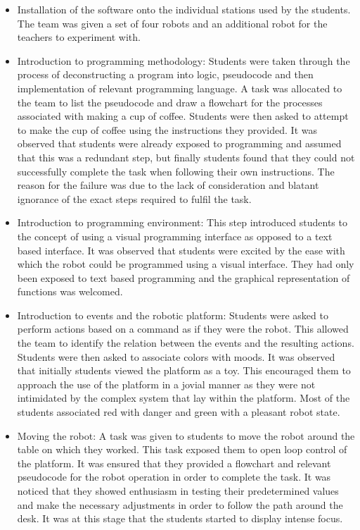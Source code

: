 \documentclass{intech-journal}
\begin{document}
\begin{itemize}
\item Installation of the software onto the individual stations used by the students. The team was given a set of four robots and an additional robot for the teachers to experiment with.
\item Introduction to programming methodology: Students were taken through the process of deconstructing a program into logic, pseudocode and then implementation of relevant programming language. 
A task was allocated to the team to list the pseudocode and draw a flowchart for the processes associated with making a cup of coffee. Students were then asked to attempt to make the cup of coffee using the instructions they provided. 
It was observed that students were already exposed to programming and assumed that this was a redundant step, but finally students found that they could not successfully complete the task when following their own instructions. 
The reason for the failure was due to the lack of consideration and blatant ignorance of the exact steps required to fulfil the task.
\item Introduction to programming environment: This step introduced students to the concept of using a visual programming interface as opposed to a text based interface.  
It was observed  that students were excited by the ease with which the robot could be programmed using a visual interface. 
They had only been exposed to text based programming and the graphical representation of functions was welcomed.
\item Introduction to events and the robotic platform: Students were asked to perform actions based on a command as if they were the robot. 
This allowed the team to identify the relation between the events and the resulting actions. 
Students were then asked to associate colors with moods. 
It was observed that initially students viewed the platform as a toy. 
This encouraged them to approach the use of the platform in a jovial manner as they were not intimidated by the complex system that lay within the platform. 
Most of the students associated red with danger and green with a pleasant robot state.
\item Moving the robot: A task was given to students to move the robot around the table on which they worked. This task exposed them to open loop control of the platform. 
It was ensured that they provided a flowchart and relevant pseudocode for the robot operation in order to complete the task. 
It was noticed that they showed enthusiasm in testing their predetermined values and make the necessary adjustments in order to follow the path around the desk. It was at this stage that the students started to display intense focus.

\end{itemize}
\end{document}
